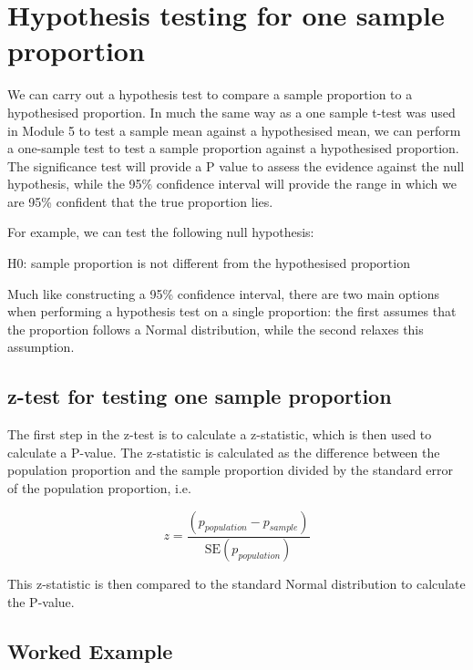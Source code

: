 \documentclass[
]{memoir}
\begin{document}
\hypertarget{hypothesis-testing-for-one-sample-proportion}{%
\section{Hypothesis testing for one sample proportion}\label{hypothesis-testing-for-one-sample-proportion}}

We can carry out a hypothesis test to compare a sample proportion to a hypothesised proportion. In much the same way as a one sample t-test was used in Module 5 to test a sample mean against a hypothesised mean, we can perform a one-sample test to test a sample proportion against a hypothesised proportion. The significance test will provide a P value to assess the evidence against the null hypothesis, while the 95\% confidence interval will provide the range in which we are 95\% confident that the true proportion lies.

For example, we can test the following null hypothesis:

H0: sample proportion is not different from the hypothesised proportion

Much like constructing a 95\% confidence interval, there are two main options when performing a hypothesis test on a single proportion: the first assumes that the proportion follows a Normal distribution, while the second relaxes this assumption.

\hypertarget{z-test-for-testing-one-sample-proportion}{%
\subsection{z-test for testing one sample proportion}\label{z-test-for-testing-one-sample-proportion}}

The first step in the z-test is to calculate a z-statistic, which is then used to calculate a P-value. The z-statistic is calculated as the difference between the population proportion and the sample proportion divided by the standard error of the population proportion, i.e.

\[
z = \frac{(p_{population} - p_{sample})}{\text{SE}(p_{population})}
\]

This z-statistic is then compared to the standard Normal distribution to calculate the P-value.

\hypertarget{worked-example-7}{%
\subsection{Worked Example}\label{worked-example-7}}
\end{document}
